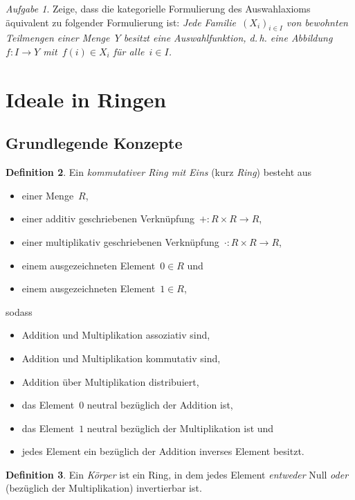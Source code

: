 \documentclass[a4paper,ngerman,12pt]{scrartcl}
\theoremstyle{definition}
\newtheorem{defn}{Definition}[section]
\theoremstyle{plain}
\theoremstyle{remark}
\newtheorem{aufg}[defn]{Aufgabe}
\renewcommand{\_}{\mathpunct{.}\,}
\newcommand{\?}{\,{:}\,}
\begin{document}
\begin{aufg}Zeige, dass die kategorielle Formulierung des Auswahlaxioms
äquivalent zu folgender Formulierung ist: \emph{Jede Familie~$(X_i)_{i \in I}$
von bewohnten Teilmengen einer Menge~$Y$ besitzt eine Auswahlfunktion, d.\,h.
eine Abbildung~$f : I \to Y$ mit~$f(i) \in X_i$ für alle~$i \in I$.}\end{aufg}


\section{Ideale in Ringen}
\label{appendix:ideale}

\subsection{Grundlegende Konzepte}

\begin{defn}Ein \emph{kommutativer Ring mit Eins} (kurz \emph{Ring}) besteht aus
\begin{itemize}
\item einer Menge~$R$,
\item einer additiv geschriebenen Verknüpfung~${+} : R \times R \to R$,
\item einer multiplikativ geschriebenen Verknüpfung~${\cdot} : R \times R \to R$,
\item einem ausgezeichneten Element~$0 \in R$ und
\item einem ausgezeichneten Element~$1 \in R$,
\end{itemize}
sodass
\begin{itemize}
\item Addition und Multiplikation assoziativ sind,
\item Addition und Multiplikation kommutativ sind,
\item Addition über Multiplikation distribuiert,
\item das Element~$0$ neutral bezüglich der Addition ist,
\item das Element~$1$ neutral bezüglich der Multiplikation ist und
\item jedes Element ein bezüglich der Addition inverses Element besitzt.
\end{itemize}
\end{defn}

\begin{defn}Ein \emph{Körper} ist ein Ring, in dem jedes Element
\emph{entweder} Null \emph{oder} (bezüglich der Multiplikation) invertierbar
ist.\end{defn}
\end{document}
